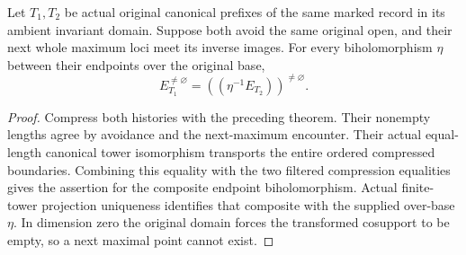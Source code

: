 \begin{theorem}
\label{hir:original-first-meeting-filtered-boundary}
\leanok
Let $T_1,T_2$ be actual original canonical prefixes of the same marked
record in its ambient invariant domain.  Suppose both avoid the same
original open, and their next whole maximum loci meet its inverse
images.  For every biholomorphism $\eta$ between their endpoints over the
original base,
\[
 E_{T_1}^{\ne\varnothing}
   =((\eta^{-1}E_{T_2}))^{\ne\varnothing}.
\]
\end{theorem}
\begin{proof}
Compress both histories with the preceding theorem.  Their nonempty
lengths agree by avoidance and the next-maximum encounter.  Their actual
equal-length canonical tower isomorphism transports the entire ordered
compressed boundaries.  Combining this equality with the two filtered
compression equalities gives the assertion for the composite endpoint
biholomorphism.  Actual finite-tower projection uniqueness identifies
that composite with the supplied over-base $\eta$.  In dimension zero
the original domain forces the transformed cosupport to be empty, so a
next maximal point cannot exist.  
\end{proof}

